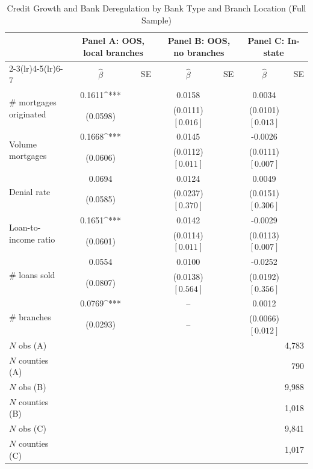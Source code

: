 \begin{table}[htbp]
\centering
\caption{Credit Growth and Bank Deregulation by Bank Type and Branch Location (Full Sample)}
\label{tab:bank_location_branches}
\small
\begin{tabular}{lcccccc}
\toprule
 & \multicolumn{2}{c}{Panel A: OOS, local branches} & \multicolumn{2}{c}{Panel B: OOS, no branches} & \multicolumn{2}{c}{Panel C: In-state} \\
\cmidrule(lr){2-3}\cmidrule(lr){4-5}\cmidrule(lr){6-7}
 & $\hat\beta$ & SE & $\hat\beta$ & SE & $\hat\beta$ & SE \\
\midrule
\multirow{2}{*}{\# mortgages originated} & 0.1611^{***} &  & 0.0158 &  & 0.0034 &  \\
 & (0.0598) &  & (0.0111) $[0.016]$ &  & (0.0101) $[0.013]$ &  \\[2pt]
\multirow{2}{*}{Volume mortgages} & 0.1668^{***} &  & 0.0145 &  & -0.0026 &  \\
 & (0.0606) &  & (0.0112) $[0.011]$ &  & (0.0111) $[0.007]$ &  \\[2pt]
\multirow{2}{*}{Denial rate} & 0.0694 &  & 0.0124 &  & 0.0049 &  \\
 & (0.0585) &  & (0.0237) $[0.370]$ &  & (0.0151) $[0.306]$ &  \\[2pt]
\multirow{2}{*}{Loan-to-income ratio} & 0.1651^{***} &  & 0.0142 &  & -0.0029 &  \\
 & (0.0601) &  & (0.0114) $[0.011]$ &  & (0.0113) $[0.007]$ &  \\[2pt]
\multirow{2}{*}{\# loans sold} & 0.0554 &  & 0.0100 &  & -0.0252 &  \\
 & (0.0807) &  & (0.0138) $[0.564]$ &  & (0.0192) $[0.356]$ &  \\[2pt]
\multirow{2}{*}{\# branches} & 0.0769^{***} &  & -- &  & 0.0012 &  \\
 & (0.0293) &  & -- &  & (0.0066) $[0.012]$ &  \\[2pt]
\midrule
$N$ obs (A) & \multicolumn{6}{r}{4,783} \\
$N$ counties (A) & \multicolumn{6}{r}{790} \\
$N$ obs (B) & \multicolumn{6}{r}{9,988} \\
$N$ counties (B) & \multicolumn{6}{r}{1,018} \\
$N$ obs (C) & \multicolumn{6}{r}{9,841} \\
$N$ counties (C) & \multicolumn{6}{r}{1,017} \\
\bottomrule
\end{tabular}
\begin{tablenotes}

\end{tablenotes}
\end{table}
